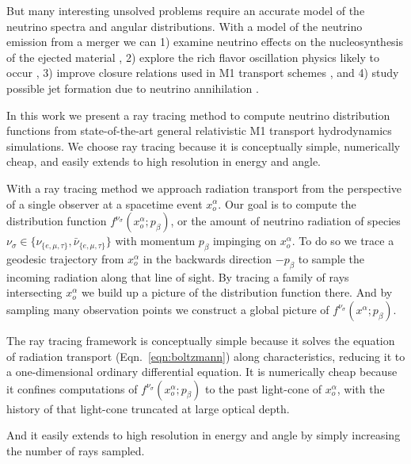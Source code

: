 \documentclass[aps,floatfix,prd,superscriptaddress,twocolumn]{revtex4-1}
\newcommand{\todo}[1]{\marginpar{\tiny{\textcolor{red}{#1}}}}
\renewcommand\todo[1]{} %
\begin{document}
But many interesting unsolved problems require an accurate model of the neutrino
spectra and angular distributions.
With a model of the neutrino emission from a merger we can
1) examine neutrino effects on the nucleosynthesis of the ejected material
\citep{surm2011-nickel_56, robe2016-sph_nu_nucleo},
2) explore the rich flavor oscillation physics likely to occur
\citep{malk2012-mnr_1, malk2015-mnr_2, malk2016-mnr_3, zhu2016-mnr_nsns_remnant,
  vaan2016-uncovering_mnr},
3) improve closure relations used in M1 transport schemes
\citep{ramp2002-truncated_moment, shib2011-truncated_moment,
  card2013-truncated_moment, fouc2015-m1_nsbh, ocon2015-gr1d_with_nu}, and
4) study possible jet formation due to neutrino annihilation
\citep{ruff1999-nunubar_nsns, asan2000-nunubar, birk2007-nunubar,
  hari2010-gr_nunubar_collapsar, zala2011-nunubar, leng2014-nunubar}.

In this work we present a ray tracing method to compute neutrino distribution
functions from state-of-the-art general relativistic M1 transport
hydrodynamics simulations.
We choose ray tracing because it is conceptually simple, numerically cheap,
and easily extends to high resolution in energy and angle.

With a ray tracing method we approach radiation transport from the perspective
of a single observer at a spacetime event $x_o^\alpha$.
Our goal is to compute the distribution function
$f^{\nu_\sigma}(x_o^\alpha;p_\beta)$, or the amount of neutrino radiation
of species $\nu_\sigma\in\{\nu_{\{e,\mu,\tau\}},\bar{\nu}_{\{e,\mu,\tau\}}\}$
with momentum $p_\beta$ impinging on $x_o^\alpha$.
To do so we trace a geodesic trajectory from $x_o^\alpha$ in the backwards
direction $-p_\beta$ to sample the incoming radiation along that line of sight.
By tracing a family of rays intersecting $x_o^\alpha$ we build up a
picture of the distribution function there.
And by sampling many observation points we construct a global picture
of $f^{\nu_\sigma}(x^\alpha;p_\beta)$.

The ray tracing framework
is conceptually simple because it solves the equation of radiation
transport (Eqn.~\ref{eqn:boltzmann}) along characteristics,
reducing it to a one-dimensional ordinary differential equation.
It is numerically cheap because it confines computations of
$f^{\nu_\sigma}(x_o^\alpha;p_\beta)$ to the past light-cone of $x_o^\alpha$,
with the history of that light-cone truncated at large optical depth.
\todo{state scaling $\mathscr{O}(n)$?}
And it easily extends to high resolution in energy and angle by simply
increasing the number of rays sampled.
\end{document}
